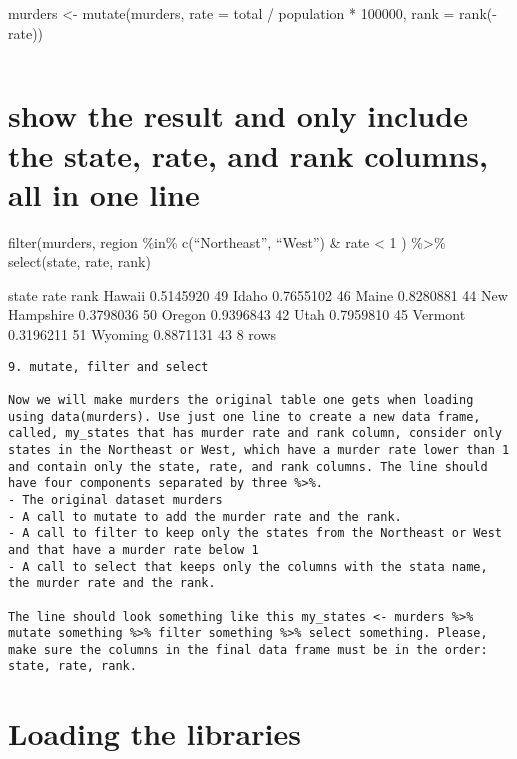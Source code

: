 \documentclass[
]{article}
\begin{document}
murders \textless- mutate(murders, rate = total / population * 100000,
rank = rank(-rate))

\begin{verbatim}
\end{verbatim}

\hypertarget{show-the-result-and-only-include-the-state-rate-and-rank-columns-all-in-one-line}{%
\section{show the result and only include the state, rate, and rank
columns, all in one
line}\label{show-the-result-and-only-include-the-state-rate-and-rank-columns-all-in-one-line}}

filter(murders, region \%in\% c(``Northeast'', ``West'') \& rate
\textless{} 1 ) \%\textgreater\% select(state, rate, rank)

state rate rank Hawaii 0.5145920 49 Idaho 0.7655102 46 Maine 0.8280881
44 New Hampshire 0.3798036 50 Oregon 0.9396843 42 Utah 0.7959810 45
Vermont 0.3196211 51 Wyoming 0.8871131 43 8 rows

\begin{verbatim}
9. mutate, filter and select

Now we will make murders the original table one gets when loading using data(murders). Use just one line to create a new data frame, called, my_states that has murder rate and rank column, consider only states in the Northeast or West, which have a murder rate lower than 1 and contain only the state, rate, and rank columns. The line should have four components separated by three %>%.
- The original dataset murders
- A call to mutate to add the murder rate and the rank.
- A call to filter to keep only the states from the Northeast or West and that have a murder rate below 1
- A call to select that keeps only the columns with the stata name, the murder rate and the rank.

The line should look something like this my_states <- murders %>% mutate something %>% filter something %>% select something. Please, make sure the columns in the final data frame must be in the order: state, rate, rank.
\end{verbatim}

\hypertarget{loading-the-libraries}{%
\section{Loading the libraries}\label{loading-the-libraries}}
\end{document}
